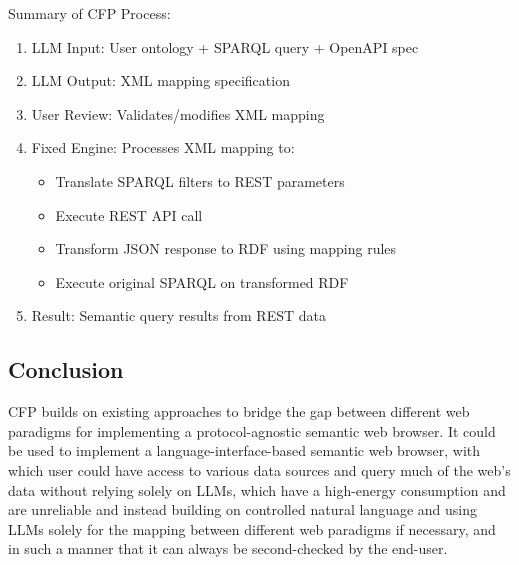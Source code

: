 \documentclass[12pt,a4paper]{article}
\begin{document}
Summary of CFP Process:
\begin{enumerate}
    \item LLM Input: User ontology + SPARQL query + OpenAPI spec
    \item LLM Output: XML mapping specification
    \item User Review: Validates/modifies XML mapping
    \item Fixed Engine: Processes XML mapping to:
    \begin{itemize}
        \item Translate SPARQL filters to REST parameters
        \item Execute REST API call
        \item Transform JSON response to RDF using mapping rules
        \item Execute original SPARQL on transformed RDF
    \end{itemize}
    \item Result: Semantic query results from REST data
\end{enumerate}

\subsection{Conclusion}

CFP builds on existing approaches to bridge the gap between different web paradigms for implementing a protocol-agnostic semantic web browser. It could be used to implement a language-interface-based semantic web browser, with which user could have access to various data sources and query much of the web's data without relying solely on LLMs, which have a high-energy consumption and are unreliable and instead building on controlled natural language and using LLMs solely for the mapping between different web paradigms if necessary, and in such a manner that it can always be second-checked by the end-user.
\end{document}
